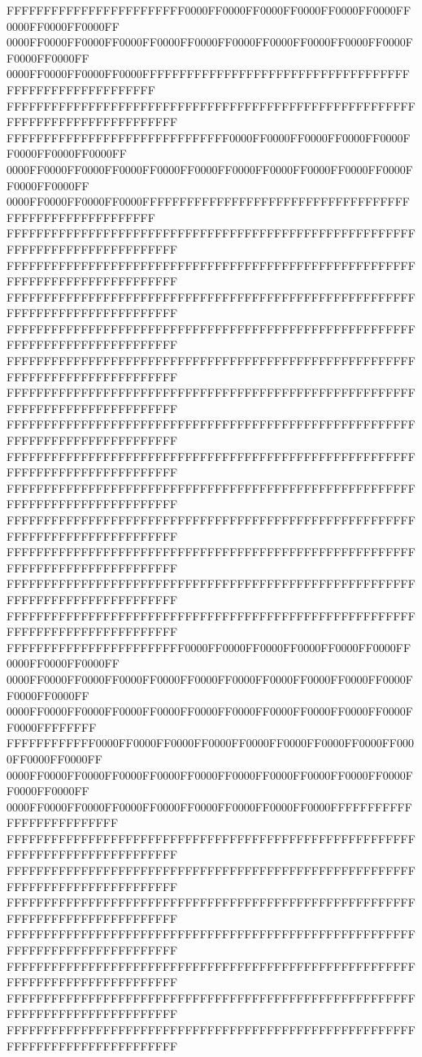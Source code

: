 FFFFFFFFFFFFFFFFFFFFFFFF0000FF0000FF0000FF0000FF0000FF0000FF0000FF0000FF0000FF
0000FF0000FF0000FF0000FF0000FF0000FF0000FF0000FF0000FF0000FF0000FF0000FF0000FF
0000FF0000FF0000FF0000FFFFFFFFFFFFFFFFFFFFFFFFFFFFFFFFFFFFFFFFFFFFFFFFFFFFFFFF
FFFFFFFFFFFFFFFFFFFFFFFFFFFFFFFFFFFFFFFFFFFFFFFFFFFFFFFFFFFFFFFFFFFFFFFFFFFFFF
FFFFFFFFFFFFFFFFFFFFFFFFFFFFFF0000FF0000FF0000FF0000FF0000FF0000FF0000FF0000FF
0000FF0000FF0000FF0000FF0000FF0000FF0000FF0000FF0000FF0000FF0000FF0000FF0000FF
0000FF0000FF0000FF0000FFFFFFFFFFFFFFFFFFFFFFFFFFFFFFFFFFFFFFFFFFFFFFFFFFFFFFFF
FFFFFFFFFFFFFFFFFFFFFFFFFFFFFFFFFFFFFFFFFFFFFFFFFFFFFFFFFFFFFFFFFFFFFFFFFFFFFF
FFFFFFFFFFFFFFFFFFFFFFFFFFFFFFFFFFFFFFFFFFFFFFFFFFFFFFFFFFFFFFFFFFFFFFFFFFFFFF
FFFFFFFFFFFFFFFFFFFFFFFFFFFFFFFFFFFFFFFFFFFFFFFFFFFFFFFFFFFFFFFFFFFFFFFFFFFFFF
FFFFFFFFFFFFFFFFFFFFFFFFFFFFFFFFFFFFFFFFFFFFFFFFFFFFFFFFFFFFFFFFFFFFFFFFFFFFFF
FFFFFFFFFFFFFFFFFFFFFFFFFFFFFFFFFFFFFFFFFFFFFFFFFFFFFFFFFFFFFFFFFFFFFFFFFFFFFF
FFFFFFFFFFFFFFFFFFFFFFFFFFFFFFFFFFFFFFFFFFFFFFFFFFFFFFFFFFFFFFFFFFFFFFFFFFFFFF
FFFFFFFFFFFFFFFFFFFFFFFFFFFFFFFFFFFFFFFFFFFFFFFFFFFFFFFFFFFFFFFFFFFFFFFFFFFFFF
FFFFFFFFFFFFFFFFFFFFFFFFFFFFFFFFFFFFFFFFFFFFFFFFFFFFFFFFFFFFFFFFFFFFFFFFFFFFFF
FFFFFFFFFFFFFFFFFFFFFFFFFFFFFFFFFFFFFFFFFFFFFFFFFFFFFFFFFFFFFFFFFFFFFFFFFFFFFF
FFFFFFFFFFFFFFFFFFFFFFFFFFFFFFFFFFFFFFFFFFFFFFFFFFFFFFFFFFFFFFFFFFFFFFFFFFFFFF
FFFFFFFFFFFFFFFFFFFFFFFFFFFFFFFFFFFFFFFFFFFFFFFFFFFFFFFFFFFFFFFFFFFFFFFFFFFFFF
FFFFFFFFFFFFFFFFFFFFFFFFFFFFFFFFFFFFFFFFFFFFFFFFFFFFFFFFFFFFFFFFFFFFFFFFFFFFFF
FFFFFFFFFFFFFFFFFFFFFFFFFFFFFFFFFFFFFFFFFFFFFFFFFFFFFFFFFFFFFFFFFFFFFFFFFFFFFF
FFFFFFFFFFFFFFFFFFFFFFFF0000FF0000FF0000FF0000FF0000FF0000FF0000FF0000FF0000FF
0000FF0000FF0000FF0000FF0000FF0000FF0000FF0000FF0000FF0000FF0000FF0000FF0000FF
0000FF0000FF0000FF0000FF0000FF0000FF0000FF0000FF0000FF0000FF0000FF0000FFFFFFFF
FFFFFFFFFFFF0000FF0000FF0000FF0000FF0000FF0000FF0000FF0000FF0000FF0000FF0000FF
0000FF0000FF0000FF0000FF0000FF0000FF0000FF0000FF0000FF0000FF0000FF0000FF0000FF
0000FF0000FF0000FF0000FF0000FF0000FF0000FF0000FF0000FFFFFFFFFFFFFFFFFFFFFFFFFF
FFFFFFFFFFFFFFFFFFFFFFFFFFFFFFFFFFFFFFFFFFFFFFFFFFFFFFFFFFFFFFFFFFFFFFFFFFFFFF
FFFFFFFFFFFFFFFFFFFFFFFFFFFFFFFFFFFFFFFFFFFFFFFFFFFFFFFFFFFFFFFFFFFFFFFFFFFFFF
FFFFFFFFFFFFFFFFFFFFFFFFFFFFFFFFFFFFFFFFFFFFFFFFFFFFFFFFFFFFFFFFFFFFFFFFFFFFFF
FFFFFFFFFFFFFFFFFFFFFFFFFFFFFFFFFFFFFFFFFFFFFFFFFFFFFFFFFFFFFFFFFFFFFFFFFFFFFF
FFFFFFFFFFFFFFFFFFFFFFFFFFFFFFFFFFFFFFFFFFFFFFFFFFFFFFFFFFFFFFFFFFFFFFFFFFFFFF
FFFFFFFFFFFFFFFFFFFFFFFFFFFFFFFFFFFFFFFFFFFFFFFFFFFFFFFFFFFFFFFFFFFFFFFFFFFFFF
FFFFFFFFFFFFFFFFFFFFFFFFFFFFFFFFFFFFFFFFFFFFFFFFFFFFFFFFFFFFFFFFFFFFFFFFFFFFFF
